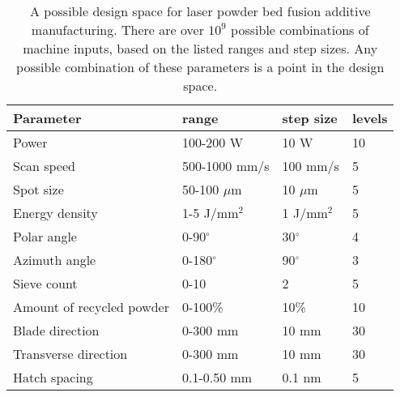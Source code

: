 \begin{table*}[t]
    \renewcommand{\arraystretch}{0.8}
    \setlength{\tabcolsep}{5pt}
    \begin{center}
        \begin{tabular}{@{}llll@{}}
            \toprule
            \hline
             Parameter & range & step size & levels \\ \midrule
            \hline
            \hline
            Power & 100-200 W & 10 W & 10 \\
            Scan speed & 500-1000 mm/s & 100 mm/s & 5 \\
            Spot size & 50-100 $\mu$m & 10 $\mu$m & 5 \\
            Energy density & 1-5 J/mm$^2$ & 1 J/mm$^2$ & 5 \\
            Polar angle & 0-90$^\circ$ & 30$^\circ$  & 4 \\
            Azimuth angle & 0-180$^\circ$ & 90$^\circ$  & 3 \\
            Sieve count & 0-10 & 2 & 5 \\
            Amount of recycled powder & 0-100\% & 10\% & 10 \\
            Blade direction & 0-300 mm & 10 mm  & 30 \\
            Transverse direction & 0-300 mm & 10 mm  & 30 \\
            Hatch spacing & 0.1-0.50 mm & 0.1 nm  & 5 \\
            \hline
            \bottomrule
        \end{tabular}
        \caption{A possible design space for laser powder bed fusion additive manufacturing. There are over $10^9$ possible combinations of machine inputs, based on the listed ranges and step sizes. Any possible combination of these parameters is a point in the design space.}
        \label{table:design_space}
    \end{center}
\end{table*}
